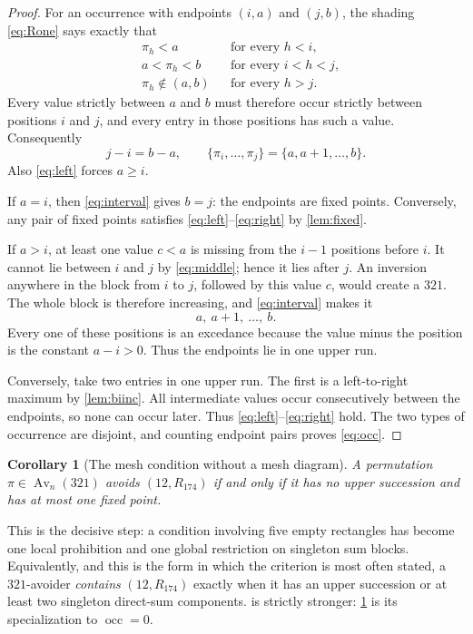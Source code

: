 \documentclass[11pt,letterpaper]{article}
\numberwithin{equation}{section}
\newtheorem{corollary}[theorem]{Corollary}
\theoremstyle{definition}
\DeclareMathOperator{\Av}{Av}
\DeclareMathOperator{\occ}{occ}
\newcommand{\Rone}{R_{174}}
\begin{document}
\begin{proof}
For an occurrence with endpoints $(i,a)$ and $(j,b)$, the shading
\eqref{eq:Rone} says exactly that
\begin{align}
 &\pi_h<a &&\text{for every }h<i, \label{eq:left}\\
 &a<\pi_h<b &&\text{for every }i<h<j,\label{eq:middle}\\
 &\pi_h\notin(a,b) &&\text{for every }h>j.\label{eq:right}
\end{align}
Every value strictly between $a$ and $b$ must therefore occur strictly
between positions $i$ and $j$, and every entry in those positions has
such a value. Consequently
\begin{equation}
 j-i=b-a,
 \qquad \{\pi_i,\ldots,\pi_j\}=\{a,a+1,\ldots,b\}.
 \label{eq:interval}
\end{equation}
Also \eqref{eq:left} forces $a\ge i$.

If $a=i$, then \eqref{eq:interval} gives $b=j$: the endpoints are fixed
points. Conversely, any pair of fixed points satisfies
\eqref{eq:left}--\eqref{eq:right} by \cref{lem:fixed}.

If $a>i$, at least one value $c<a$ is missing from the $i-1$ positions
before $i$. It cannot lie between $i$ and $j$ by \eqref{eq:middle}; hence
it lies after $j$. An inversion anywhere in the block from $i$ to $j$,
followed by this value $c$, would create a $321$. The whole block is
therefore increasing, and \eqref{eq:interval} makes it
\[
 a,\ a+1,\ \ldots,\ b.
\]
Every one of these positions is an excedance because the value minus
the position is the constant $a-i>0$. Thus the endpoints lie in one
upper run.

Conversely, take two entries in one upper run. The first is a
left-to-right maximum by \cref{lem:biinc}. All intermediate values occur
consecutively between the endpoints, so none can occur later.
Thus \eqref{eq:left}--\eqref{eq:right} hold. The two types of occurrence
are disjoint, and counting endpoint pairs proves \eqref{eq:occ}.
\end{proof}

\begin{corollary}[The mesh condition without a mesh diagram]
\label{cor:character}
A permutation $\pi\in\Av_n(321)$ avoids $(12,\Rone)$ if and only if
it has no upper succession and has at most one fixed point.
\end{corollary}

This is the decisive step: a condition involving five empty rectangles
has become one local prohibition and one global restriction on singleton
sum blocks. Equivalently, and this is the form in which the criterion is
most often stated, a $321$-avoider \emph{contains} $(12,\Rone)$ exactly
when it has an upper succession or at least two singleton direct-sum
components.  is strictly stronger: \cref{cor:character} is
its specialization to $\occ=0$.
\end{document}
